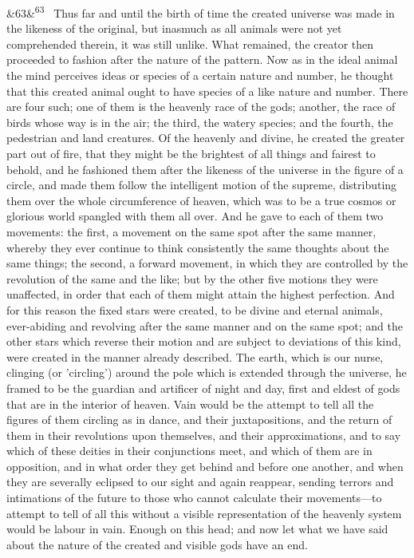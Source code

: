 \documentclass[12pt]{article}
\newcommand{\para}[1][]{\par\noindent\ifx&#1&\else\textsuperscript{\footnotesize #1}~\fi}
\begin{document}
\para[63] Thus far and until the birth of time the created universe was made in the likeness of the original, but inasmuch as all animals were not yet comprehended therein, it was still unlike. What remained, the creator then proceeded to fashion after the nature of the pattern. Now as in the ideal animal the mind perceives ideas or species of a certain nature and number, he thought that this created animal ought to have species of a like nature and number. There are four such; one of them is the heavenly race of the gods; another, the race of birds whose way is in the air; the third, the watery species; and the fourth, the pedestrian and land creatures. Of the heavenly and divine, he created the greater part out of fire, that they might be the brightest of all things and fairest to behold, and he fashioned them after the likeness of the universe in the figure of a circle, and made them follow the intelligent motion of the supreme, distributing them over the whole circumference of heaven, which was to be a true cosmos or glorious world spangled with them all over. And he gave to each of them two movements: the first, a movement on the same spot after the same manner, whereby they ever continue to think consistently the same thoughts about the same things; the second, a forward movement, in which they are controlled by the revolution of the same and the like; but by the other five motions they were unaffected, in order that each of them might attain the highest perfection. And for this reason the fixed stars were created, to be divine and eternal animals, ever-abiding and revolving after the same manner and on the same spot; and the other stars which reverse their motion and are subject to deviations of this kind, were created in the manner already described. The earth, which is our nurse, clinging (or 'circling') around the pole which is extended through the universe, he framed to be the guardian and artificer of night and day, first and eldest of gods that are in the interior of heaven. Vain would be the attempt to tell all the figures of them circling as in dance, and their juxtapositions, and the return of them in their revolutions upon themselves, and their approximations, and to say which of these deities in their conjunctions meet, and which of them are in opposition, and in what order they get behind and before one another, and when they are severally eclipsed to our sight and again reappear, sending terrors and intimations of the future to those who cannot calculate their movements---to attempt to tell of all this without a visible representation of the heavenly system would be labour in vain. Enough on this head; and now let what we have said about the nature of the created and visible gods have an end.
\end{document}
